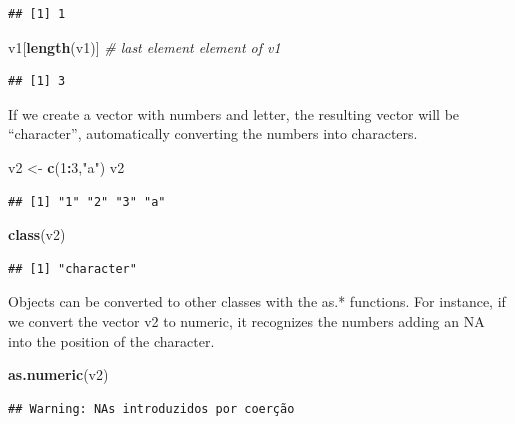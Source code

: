 \documentclass[12pt,graybox,envcountchap,sectrefs]{krantz}
\makeatletter
\newenvironment{Shaded}{\begin{snugshade}}{\end{snugshade}}
\newcommand{\KeywordTok}[1]{\textcolor[rgb]{0.13,0.29,0.53}{\textbf{#1}}}
\newcommand{\DecValTok}[1]{\textcolor[rgb]{0.00,0.00,0.81}{#1}}
\newcommand{\StringTok}[1]{\textcolor[rgb]{0.31,0.60,0.02}{#1}}
\newcommand{\CommentTok}[1]{\textcolor[rgb]{0.56,0.35,0.01}{\textit{#1}}}
\newcommand{\OperatorTok}[1]{\textcolor[rgb]{0.81,0.36,0.00}{\textbf{#1}}}
\newcommand{\NormalTok}[1]{#1}
\newenvironment{kframe}{%
\medskip{}
\setlength{\fboxsep}{.8em}
 \def\at@end@of@kframe{}%
 \ifinner\ifhmode%
  \def\at@end@of@kframe{\end{minipage}}%
  \begin{minipage}{\columnwidth}%
 \fi\fi%
 \def\FrameCommand##1{\hskip\@totalleftmargin \hskip-\fboxsep
 \colorbox{shadecolor}{##1}\hskip-\fboxsep
     \hskip-\linewidth \hskip-\@totalleftmargin \hskip\columnwidth}%
 \MakeFramed {\advance\hsize-\width
   \@totalleftmargin\z@ \linewidth\hsize
   \@setminipage}}%
 {\par\unskip\endMakeFramed%
 \at@end@of@kframe}
\renewenvironment{Shaded}{\begin{kframe}}{\end{kframe}}
\theoremstyle{definition}
\theoremstyle{definition}
\theoremstyle{definition}
\theoremstyle{remark}
\makeatother
\begin{document}
\begin{verbatim}
## [1] 1
\end{verbatim}

\begin{Shaded}
\begin{Highlighting}[]
\NormalTok{v1[}\KeywordTok{length}\NormalTok{(v1)] }\CommentTok{# last element element of v1}
\end{Highlighting}
\end{Shaded}

\begin{verbatim}
## [1] 3
\end{verbatim}

If we create a vector with numbers and letter, the resulting vector will
be ``character'', automatically converting the numbers into characters.

\begin{Shaded}
\begin{Highlighting}[]
\NormalTok{v2 <-}\StringTok{ }\KeywordTok{c}\NormalTok{(}\DecValTok{1}\OperatorTok{:}\DecValTok{3}\NormalTok{,}\StringTok{"a"}\NormalTok{)}
\NormalTok{v2}
\end{Highlighting}
\end{Shaded}

\begin{verbatim}
## [1] "1" "2" "3" "a"
\end{verbatim}

\begin{Shaded}
\begin{Highlighting}[]
\KeywordTok{class}\NormalTok{(v2)}
\end{Highlighting}
\end{Shaded}

\begin{verbatim}
## [1] "character"
\end{verbatim}

Objects can be converted to other classes with the as.* functions. For
instance, if we convert the vector v2 to numeric, it recognizes the
numbers adding an NA into the position of the character.

\begin{Shaded}
\begin{Highlighting}[]
\KeywordTok{as.numeric}\NormalTok{(v2)}
\end{Highlighting}
\end{Shaded}

\begin{verbatim}
## Warning: NAs introduzidos por coerção
\end{verbatim}
\end{document}
